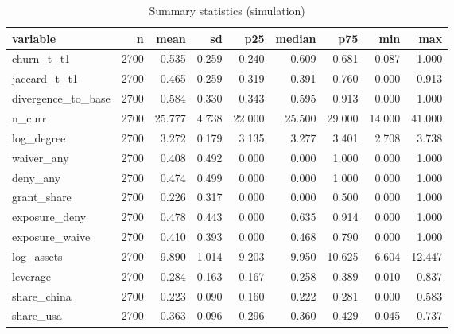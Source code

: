 \begin{table}

\caption{Summary statistics (simulation)}
\centering
\begin{tabular}[t]{lrrrrrrrr}
\toprule
variable & n & mean & sd & p25 & median & p75 & min & max\\
\midrule
churn\_t\_t1 & 2700 & 0.535 & 0.259 & 0.240 & 0.609 & 0.681 & 0.087 & 1.000\\
jaccard\_t\_t1 & 2700 & 0.465 & 0.259 & 0.319 & 0.391 & 0.760 & 0.000 & 0.913\\
divergence\_to\_base & 2700 & 0.584 & 0.330 & 0.343 & 0.595 & 0.913 & 0.000 & 1.000\\
n\_curr & 2700 & 25.777 & 4.738 & 22.000 & 25.500 & 29.000 & 14.000 & 41.000\\
log\_degree & 2700 & 3.272 & 0.179 & 3.135 & 3.277 & 3.401 & 2.708 & 3.738\\
\addlinespace
waiver\_any & 2700 & 0.408 & 0.492 & 0.000 & 0.000 & 1.000 & 0.000 & 1.000\\
deny\_any & 2700 & 0.474 & 0.499 & 0.000 & 0.000 & 1.000 & 0.000 & 1.000\\
grant\_share & 2700 & 0.226 & 0.317 & 0.000 & 0.000 & 0.500 & 0.000 & 1.000\\
exposure\_deny & 2700 & 0.478 & 0.443 & 0.000 & 0.635 & 0.914 & 0.000 & 1.000\\
exposure\_waive & 2700 & 0.410 & 0.393 & 0.000 & 0.468 & 0.790 & 0.000 & 1.000\\
\addlinespace
log\_assets & 2700 & 9.890 & 1.014 & 9.203 & 9.950 & 10.625 & 6.604 & 12.447\\
leverage & 2700 & 0.284 & 0.163 & 0.167 & 0.258 & 0.389 & 0.010 & 0.837\\
share\_china & 2700 & 0.223 & 0.090 & 0.160 & 0.222 & 0.281 & 0.000 & 0.583\\
share\_usa & 2700 & 0.363 & 0.096 & 0.296 & 0.360 & 0.429 & 0.045 & 0.737\\
\bottomrule
\end{tabular}
\end{table}